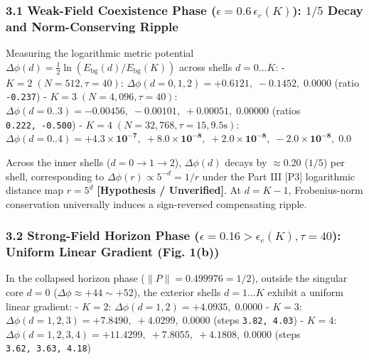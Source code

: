 \documentclass[
  a4paper,
]{article}
\begin{document}
\subsubsection{\texorpdfstring{3.1 Weak-Field Coexistence Phase
(\(\epsilon = 0.6\,\epsilon_c(K)\)): \(1/5\) Decay and Norm-Conserving
Ripple}{3.1 Weak-Field Coexistence Phase (\textbackslash epsilon = 0.6\textbackslash,\textbackslash epsilon\_c(K)): 1/5 Decay and Norm-Conserving Ripple}}\label{weak-field-coexistence-phase-epsilon-0.6epsilon_ck-15-decay-and-norm-conserving-ripple}

Measuring the logarithmic metric potential
\(\Delta\phi(d) = \frac{1}{2}\ln(E_{\mathrm{bg}}(d)/E_{\mathrm{bg}}(K))\)
across shells \(d = 0 \dots K\): - \textbf{\(K = 2\;(N=512, \tau=40)\)}:
\(\Delta\phi(d=0,1,2) = \mathbf{+0.6121,\; -0.1452,\; 0.0000}\) (ratio
\texttt{-0.237}) - \textbf{\(K = 3\;(N=4{,}096, \tau=40)\)}:
\(\Delta\phi(d=0..3) = \mathbf{-0.00456,\; -0.00101,\; +0.00051,\; 0.00000}\)
(ratios \texttt{0.222,\ -0.500}) -
\textbf{\(K = 4\;(N=32{,}768, \tau=15, 9.5\text{s})\)}:
\(\Delta\phi(d=0..4) = \mathbf{+4.3\times 10^{-7},\; +8.0\times 10^{-8},\; +2.0\times 10^{-8},\; -2.0\times 10^{-8},\; 0.0}\)

Across the inner shells (\(d = 0 \to 1 \to 2\)), \(\Delta\phi(d)\)
decays by \(\approx \mathbf{0.20}\) (\(1/5\)) per shell, corresponding
to \(\Delta\phi(r) \propto 5^{-d} = 1/r\) under the Part III {[}P3{]}
logarithmic distance map \(r = 5^d\) \textbf{{[}Hypothesis /
Unverified{]}}. At \(d = K - 1\), Frobenius-norm conservation
universally induces a sign-reversed compensating ripple.

\subsubsection{\texorpdfstring{3.2 Strong-Field Horizon Phase
(\(\epsilon = 0.16 > \epsilon_c(K), \tau=40\)): Uniform Linear Gradient
(Fig.
1(b))}{3.2 Strong-Field Horizon Phase (\textbackslash epsilon = 0.16 \textgreater{} \textbackslash epsilon\_c(K), \textbackslash tau=40): Uniform Linear Gradient (Fig. 1(b))}}\label{strong-field-horizon-phase-epsilon-0.16-epsilon_ck-tau40-uniform-linear-gradient-fig.-1b}

In the collapsed horizon phase (\(\|P\| = 0.499976 = 1/2\)), outside the
singular core \(d = 0\) (\(\Delta\phi \approx +44 \sim +52\)), the
exterior shells \(d = 1 \dots K\) exhibit a uniform linear gradient: -
\textbf{\(K = 2\)}: \(\Delta\phi(d=1, 2) = \mathbf{+4.0935,\; 0.0000}\)
- \textbf{\(K = 3\)}:
\(\Delta\phi(d=1, 2, 3) = \mathbf{+7.8490,\; +4.0299,\; 0.0000}\) (steps
\texttt{3.82,\ 4.03}) - \textbf{\(K = 4\)}:
\(\Delta\phi(d=1, 2, 3, 4) = \mathbf{+11.4299,\; +7.8055,\; +4.1808,\; 0.0000}\)
(steps \texttt{3.62,\ 3.63,\ 4.18})
\end{document}
